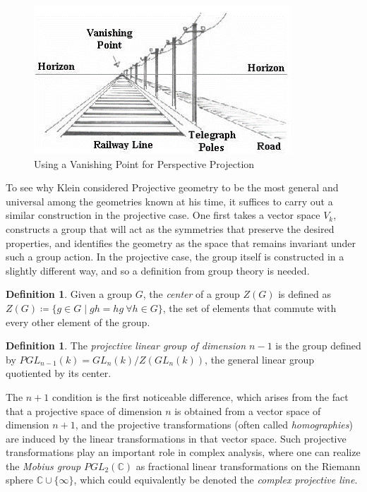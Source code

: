 \documentclass{article}
\theoremstyle{definition}
\newtheorem{definition}[theorem]{Definition} %
\newcommand\CC{\mathbb{C}}
\newcommand{\definedas}[0]{\coloneqq}
\newcommand{\theset}[1]{\{ #1 \}}
\begin{document}
\begin{figure}[h]
\centering
\includegraphics[width=0.8\linewidth]{vanishing.png}
\caption{Using a Vanishing Point for Perspective Projection}
\label{fig:my_label7}
\end{figure}

To see why Klein considered Projective geometry to be the
most general and universal among the geometries known at his time, it
suffices to carry out a similar construction in the projective case. One
first takes a vector space \(V_k\), constructs a group that will act as
the symmetries that preserve the desired properties, and identifies the geometry as the space that remains invariant under such a group action. In the projective case, the group itself is constructed in a slightly different way, and so a definition from group theory is needed.

\begin{definition} Given a group \(G\), the \emph{center} of a group \(Z(G)\)
is defined as
\(Z(G) \definedas \theset{g\in G \mid gh = hg ~\forall h\in G}\), the
set of elements that commute with every other element of the group.
\end{definition}

\begin{definition} The \emph{projective linear group of dimension \(n-1\)} is
the group defined by \(PGL_{n-1}(k) = GL_n(k) / Z(GL_n(k))\), the
general linear group quotiented by its center.
\end{definition}

The \(n+1\) condition is the first noticeable difference, which arises
from the fact that a projective space of dimension \(n\) is obtained
from a vector space of dimension \(n+1\), and the projective
transformations (often called \emph{homographies}) are induced by the
linear transformations in that vector space. Such projective
transformations play an important role in complex analysis, where one
can realize the \emph{Mobius group} \(PGL_2(\CC)\) as fractional linear
transformations on the Riemann sphere \(\CC \cup \theset{\infty}\),
which could equivalently be denoted the \emph{complex projective line}.
\end{document}
